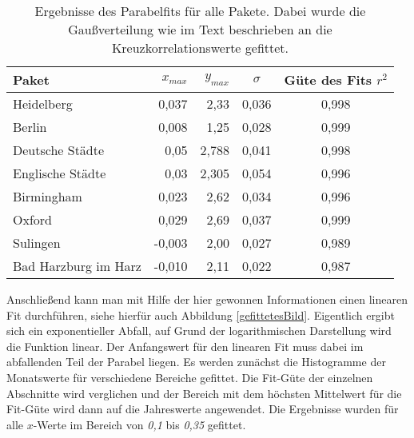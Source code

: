 \documentclass[fontsize=11pt, twoside, a4paper]{scrartcl}
\begin{document}
\begin{table}[H]
	\centering
    \caption{Ergebnisse des Parabelfits für alle Pakete. Dabei wurde die Gaußverteilung wie im Text beschrieben an die Kreuzkorrelationswerte gefittet.}
    \vspace{1mm}
    \begin{tabular}{|l|r|r|c|c|}
	\hline
	Paket & $x_{max}$ & $y_{max}$ & $\sigma$ & Güte des Fits $r^{2}$ \\
	\hline
	Heidelberg & 0,037 & 2,33 & 0,036 & 0,998 \\
	Berlin & 0,008 & 1,25 & 0,028 & 0,999 \\
	Deutsche Städte & 0,05 & 2,788 & 0,041 & 0,998 \\
	Englische Städte & 0,03 & 2,305 & 0,054 & 0,996 \\
	Birmingham & 0,023 & 2,62 & 0,034 & 0,996 \\
	Oxford & 0,029 & 2,69 & 0,037 & 0,999 \\ 
	Sulingen & -0,003 & 2,00 & 0,027 & 0,989 \\
	Bad Harzburg im Harz & -0,010 & 2,11 & 0,022 & 0,987 \\
	\hline
    \end{tabular}
\end{table}
Anschließend kann man mit Hilfe der hier gewonnen Informationen einen linearen Fit durchführen, siehe hierfür auch Abbildung \ref{gefittetesBild}. Eigentlich ergibt sich ein exponentieller Abfall, auf Grund der logarithmischen Darstellung wird die Funktion linear. Der Anfangswert für den linearen Fit muss dabei im abfallenden Teil der Parabel liegen. Es werden zunächst die Histogramme der Monatswerte für verschiedene Bereiche gefittet. Die Fit-Güte der einzelnen Abschnitte wird verglichen und der Bereich mit dem höchsten Mittelwert für die Fit-Güte wird dann auf die Jahreswerte angewendet. Die Ergebnisse wurden für alle $x$-Werte im Bereich von \textit{0,1} bis \textit{0,35} gefittet.
\vspace{5mm}\\
\end{document}
